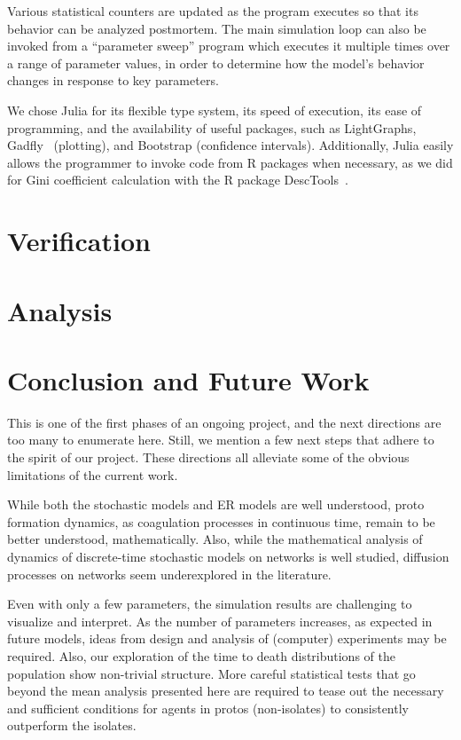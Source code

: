 Various statistical counters are updated as the program executes so that its behavior can be analyzed postmortem. The main simulation loop can also be invoked from a ``parameter sweep'' program which executes it multiple times over a range of parameter values, in order to determine how the model's behavior changes in response to key parameters.

We chose Julia for its flexible type system, its speed of execution, its ease of programming, and the availability of useful packages, such as LightGraphs, Gadfly~\cite{Gadfly-2018} (plotting), and Bootstrap (confidence intervals).  Additionally, Julia easily allows the programmer to invoke code from R packages when necessary, as we did for Gini coefficient calculation with the R package DescTools~\cite{DescTools-2019}.


\section{Verification}


\section{Analysis}

\section{Conclusion and Future Work}
This is one of the first phases of an ongoing project, and the next directions are too many to enumerate here. Still, we mention a few next steps that adhere to the spirit of our project. These directions all alleviate some of the obvious limitations of the current work. 

While both the stochastic models and ER models are well understood, proto formation dynamics, as coagulation processes in continuous time, remain to be better understood, mathematically. Also, while the mathematical analysis of dynamics of discrete-time stochastic models on networks is well studied, diffusion processes on networks seem underexplored in the literature. 

Even with only a few parameters, the simulation results are challenging to visualize and interpret. As the number of parameters increases, as expected in future models, ideas from design and analysis of (computer) experiments may be required. Also, our exploration of the time to death distributions of the population show non-trivial structure. More careful statistical tests that go beyond the mean analysis presented here are required to tease out the necessary and sufficient conditions for agents in protos (non-isolates) to consistently outperform the isolates.   

